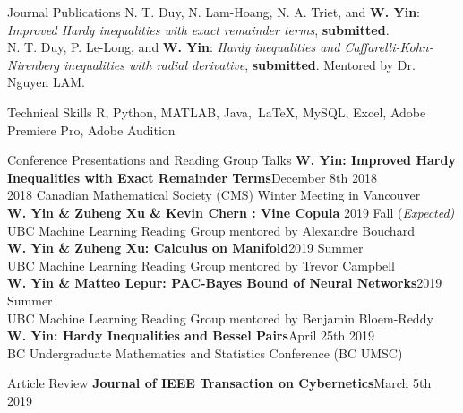 \documentclass{resume}
\begin{document}
\begin{rSection}{Journal Publications} 
 N. T. Duy, N. Lam-Hoang, N. A. Triet, and \textbf{W. Yin}: \textit{Improved Hardy inequalities with exact remainder terms},  \textbf{submitted}.\\
 N. T. Duy, P. Le-Long, and \textbf{W. Yin}: \textit{Hardy inequalities and Caffarelli-Kohn-Nirenberg inequalities with radial derivative},  \textbf{submitted}. Mentored by Dr. Nguyen LAM.
\end{rSection}
\begin{rSection}{Technical Skills}
R, Python, MATLAB, Java,\ \newcommand{\latex}{\LaTeX\xspace}\latex , MySQL, Excel, Adobe Premiere Pro, Adobe Audition
\end{rSection}
\begin{rSection}{Conference Presentations and Reading Group Talks}
{\bf W. Yin:  Improved Hardy Inequalities with Exact Remainder Terms}\hfill{December 8th 2018}\\{2018 Canadian Mathematical Society (CMS) Winter Meeting in Vancouver}\\
{\bf W. Yin \& Zuheng Xu \& Kevin Chern :  Vine Copula}\hfill{ 2019 Fall (\em Expected)}\\{UBC Machine Learning Reading Group mentored by  Alexandre Bouchard}\\
{\bf W. Yin \& Zuheng Xu:  Calculus on Manifold}\hfill{2019 Summer}\\{UBC Machine Learning Reading Group mentored by  Trevor Campbell}\\
{\bf W. Yin \& Matteo Lepur: PAC-Bayes Bound of Neural Networks}\hfill{2019 Summer}\\{UBC Machine Learning Reading Group mentored by  Benjamin Bloem-Reddy}\\
{\bf W. Yin:  Hardy Inequalities and Bessel Pairs}\hfill{April 25th 2019}\\{BC Undergraduate Mathematics and Statistics Conference (BC UMSC)}


\end{rSection}

\begin{rSection}{Article Review}
{\bf Journal of IEEE Transaction on Cybernetics}\hfill{March 5th 2019}
\end{rSection}
\end{document}
